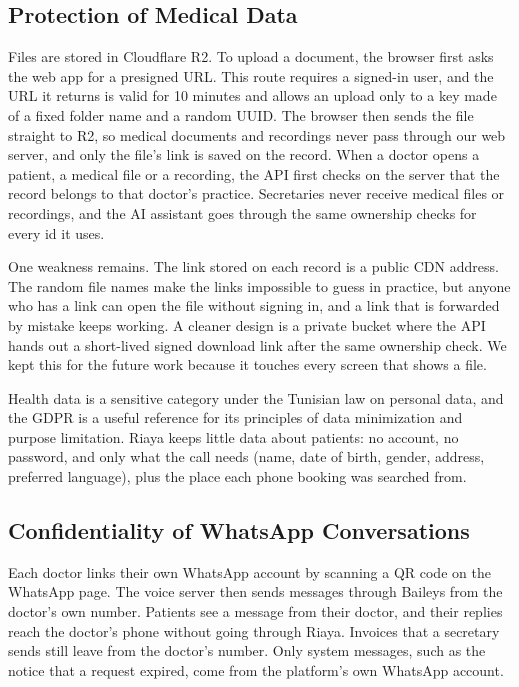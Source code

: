 \subsection{Protection of Medical Data}

Files are stored in Cloudflare R2. To upload a document, the browser first asks the web app for a presigned URL. This route requires a signed-in user, and the URL it returns is valid for 10 minutes and allows an upload only to a key made of a fixed folder name and a random UUID. The browser then sends the file straight to R2, so medical documents and recordings never pass through our web server, and only the file's link is saved on the record. When a doctor opens a patient, a medical file or a recording, the API first checks on the server that the record belongs to that doctor's practice. Secretaries never receive medical files or recordings, and the AI assistant goes through the same ownership checks for every id it uses.

One weakness remains. The link stored on each record is a public CDN address. The random file names make the links impossible to guess in practice, but anyone who has a link can open the file without signing in, and a link that is forwarded by mistake keeps working. A cleaner design is a private bucket where the API hands out a short-lived signed download link after the same ownership check. We kept this for the future work because it touches every screen that shows a file.

Health data is a sensitive category under the Tunisian law on personal data, and the GDPR is a useful reference for its principles of data minimization and purpose limitation. Riaya keeps little data about patients: no account, no password, and only what the call needs (name, date of birth, gender, address, preferred language), plus the place each phone booking was searched from.

\subsection{Confidentiality of WhatsApp Conversations}

Each doctor links their own WhatsApp account by scanning a QR code on the WhatsApp page. The voice server then sends messages through Baileys from the doctor's own number. Patients see a message from their doctor, and their replies reach the doctor's phone without going through Riaya. Invoices that a secretary sends still leave from the doctor's number. Only system messages, such as the notice that a request expired, come from the platform's own WhatsApp account.

